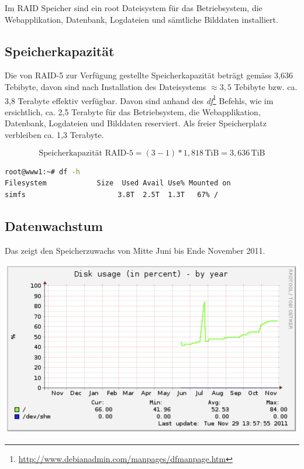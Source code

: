Im RAID Speicher sind ein root Dateisystem für das Betriebsystem, die Webapplikation, Datenbank, Logdateien und sämtliche Bilddaten installiert.

\subsection{Speicherkapazität}
Die von RAID-5 zur Verfügung gestellte Speicherkapazität beträgt gemäss  3,636 Tebibyte, davon sind nach Installation des Dateisystems $\approx 3,5$ Tebibyte bzw. ca. 3,8 Terabyte effektiv verfügbar. Davon sind anhand des \textit{df}\footnote{\url{http://www.debianadmin.com/manpages/dfmanpage.htm}}
 Befehls, wie im  ersichtlich, ca. 2,5 Terabyte für das Betriebsystem, die Webapplikation, Datenbank, Logdateien und Bilddaten reserviert. Als freier Speicherplatz verbleiben ca. 1,3 Terabyte.

\begin{equation}
\mbox{Speicherkapazität RAID-5}= (3 - 1) * 1,818 \, \mathrm{TiB} = 3,636 \, \mathrm{TiB}
\label{eqn:RAID-5-3disk}
\end{equation}

\begin{lstlisting}[label=df, language=Bash, caption=Report Dateisystem Speicherplatz Belegung in Dezimal Prefix ]
root@www1:~# df -h
Filesystem            Size  Used Avail Use% Mounted on
simfs                      3.8T  2.5T  1.3T   67% /
\end{lstlisting}

\subsection{Datenwachstum}
Das  zeigt den Speicherzuwachs von Mitte Juni bis Ende November 2011.

\begin{center}
\includegraphics[width=\linewidth, keepaspectratio = true]{media/disk-usage-by-year.png}
\end{center}

